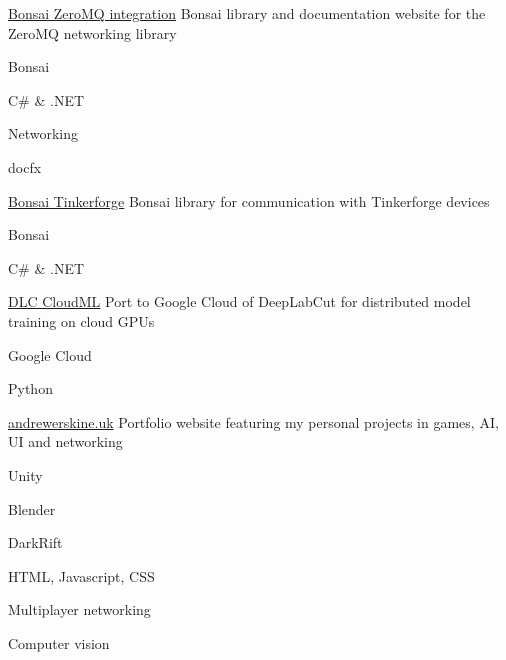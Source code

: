 

\begin{cventries}

  \cventry%
    {} %
    {\href{https://github.com/bonsai-rx/zeromq}{Bonsai ZeroMQ integration}} %
    {} %
    {} %
    {Bonsai library and documentation website for the ZeroMQ networking library}
    \begin{cventryskills}
      \item Bonsai
      \item C\# \& .NET
      \item Networking
      \item docfx
    \end{cventryskills}

  \cventry%
    {} %
    {\href{https://github.com/emotional-cities/tinkerforge}{Bonsai Tinkerforge}} %
    {} %
    {} %
    {Bonsai library for communication with Tinkerforge devices}
    \begin{cventryskills}
      \item Bonsai
      \item C\# \& .NET
    \end{cventryskills}

  \cventry%
    {} %
    {\href{https://github.com/RoboDoig/dlc-cloudml}{DLC CloudML}} %
    {} %
    {} %
    {Port to Google Cloud of DeepLabCut for distributed model training on cloud GPUs}
    \begin{cventryskills}
      \item Google Cloud
      \item Python
    \end{cventryskills}

  \cventry%
    {} %
    {\href{https://andrewerskine.uk}{andrewerskine.uk}} %
    {} %
    {} %
    {Portfolio website featuring my personal projects in games, AI, UI and networking}
    \begin{cventryskills}
      \item Unity
      \item Blender
      \item DarkRift
      \item HTML, Javascript, CSS
      \item Multiplayer networking
      \item Computer vision
    \end{cventryskills}

\end{cventries}
